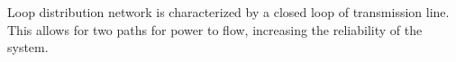 Loop distribution network is characterized by a closed loop of transmission line. This allows for two paths for power to flow, increasing the reliability of the system.


\begin{comment}

potential sources

\end{comment}